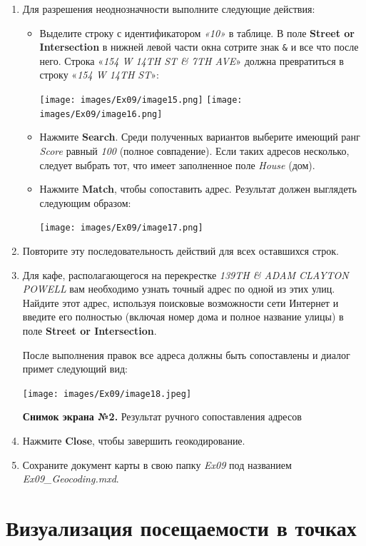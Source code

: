 \documentclass[12pt,]{book}
\begin{document}
\begin{enumerate}
\def\labelenumi{\arabic{enumi}.}
\item
  Для разрешения неоднозначности выполните следующие действия:

  \begin{itemize}
  \item
    Выделите строку с идентификатором \emph{«10»} в таблице. В поле \textbf{Street or Intersection} в нижней левой части окна сотрите знак \texttt{\&} и все что после него. Строка «\emph{154 W 14TH ST \& 7TH AVE}» должна превратиться в строку «\emph{154 W 14TH ST}»:

    \texttt{[image: images/Ex09/image15.png]} \texttt{[image: images/Ex09/image16.png]}
  \item
    Нажмите \textbf{Search}. Среди полученных вариантов выберите имеющий ранг \emph{Score} равный \emph{100} (полное совпадение). Если таких адресов несколько, следует выбрать тот, что имеет заполненное поле \emph{House} (дом).
  \item
    Нажмите \textbf{Match}, чтобы сопоставить адрес. Результат должен выглядеть следующим образом:

    \texttt{[image: images/Ex09/image17.png]}
  \end{itemize}
\item
  Повторите эту последовательность действий для всех оставшихся строк.
\item
  Для кафе, располагающегося на перекрестке \emph{139TH \& ADAM CLAYTON POWELL} вам необходимо узнать точный адрес по одной из этих улиц. Найдите этот адрес, используя поисковые возможности сети Интернет и введите его полностью (включая номер дома и полное название улицы) в поле \textbf{Street or Intersection}.

  После выполнения правок все адреса должны быть сопоставлены и диалог примет следующий вид:

  \texttt{[image: images/Ex09/image18.jpeg]}

  \textbf{Снимок экрана №2.} Результат ручного сопоставления адресов
\item
  Нажмите \textbf{Close}, чтобы завершить геокодирование.
\item
  Сохраните документ карты в свою папку \emph{Ex09} под названием \emph{Ex09\_Geocoding.mxd}.
\end{enumerate}

\hypertarget{geocoding-visitors}{%
\section{Визуализация посещаемости в точках}\label{geocoding-visitors}}
\end{document}
